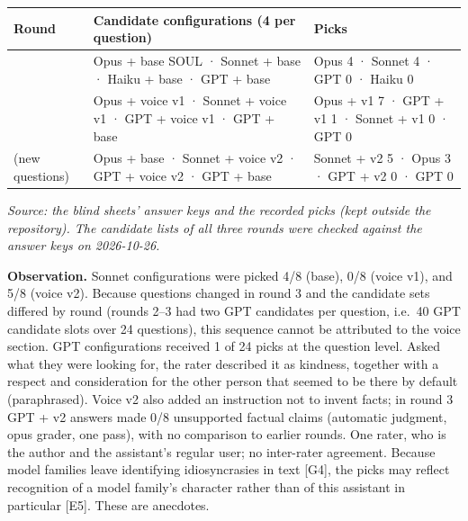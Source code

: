 \documentclass[10pt]{article}
\begin{document}
{\def\LTcaptype{none} %
\begin{longtable}[]{@{}
  >{\raggedright\arraybackslash}p{}
  >{\raggedright\arraybackslash}p{}
  >{\raggedright\arraybackslash}p{}@{}}
\toprule\noalign{}
\begin{minipage}[b]{\linewidth}\raggedright
Round
\end{minipage} & \begin{minipage}[b]{\linewidth}\raggedright
Candidate configurations (4 per question)
\end{minipage} & \begin{minipage}[b]{\linewidth}\raggedright
Picks
\end{minipage} \\
\midrule\noalign{}
\endhead
\bottomrule\noalign{}
\endlastfoot
1 & Opus + base SOUL · Sonnet + base · Haiku + base · GPT + base & Opus 4 · Sonnet 4 · GPT 0 · Haiku 0 \\
2 & Opus + voice v1 · Sonnet + voice v1 · GPT + voice v1 · GPT + base & Opus + v1 7 · GPT + v1 1 · Sonnet + v1 0 · GPT 0 \\
3 (new questions) & Opus + base · Sonnet + voice v2 · GPT + voice v2 · GPT + base & Sonnet + v2 5 · Opus 3 · GPT + v2 0 · GPT 0 \\
\end{longtable}
}

\emph{Source: the blind sheets' answer keys and the recorded picks (kept outside the repository). The candidate lists of all three rounds were checked against the answer keys on 2026-10-26.}

\textbf{Observation.} Sonnet configurations were picked 4/8 (base), 0/8 (voice v1), and 5/8 (voice v2). Because questions changed in round 3 and the candidate sets differed by round (rounds 2--3 had two GPT candidates per question, i.e.~40 GPT candidate slots over 24 questions), this sequence cannot be attributed to the voice section. GPT configurations received 1 of 24 picks at the question level. Asked what they were looking for, the rater described it as kindness, together with a respect and consideration for the other person that seemed to be there by default (paraphrased). Voice v2 also added an instruction not to invent facts; in round 3 GPT + v2 answers made 0/8 unsupported factual claims (automatic judgment, opus grader, one pass), with no comparison to earlier rounds. One rater, who is the author and the assistant's regular user; no inter-rater agreement. Because model families leave identifying idiosyncrasies in text {[}G4{]}, the picks may reflect recognition of a model family's character rather than of this assistant in particular {[}E5{]}. These are anecdotes.
\end{document}
